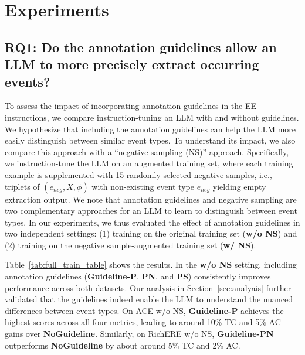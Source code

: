 \section{Experiments}




\subsection{RQ1: Do the annotation guidelines allow an LLM to more precisely extract occurring events?}
To assess the impact of incorporating annotation guidelines in the EE instructions, we compare instruction-tuning an LLM with and without guidelines. We hypothesize that including the annotation guidelines can help the LLM more easily distinguish between similar event types. To understand its impact, we also compare this approach with a ``negative sampling (NS)'' approach. Specifically, we instruction-tune the LLM on an augmented training set, where each training example is supplemented with 15 randomly selected negative samples, i.e., triplets of $(e_{neg}, X, \phi)$ with non-existing event type $e_{neg}$ yielding empty extraction output. We note that annotation guidelines and negative sampling are two complementary approaches for an LLM to learn to distinguish between event types. In our experiments, we thus evaluated the effect of annotation guidelines in two independent settings: (1) training on the original training set (\textbf{w/o NS}) and (2) training on the negative sample-augmented training set (\textbf{w/ NS}).


Table~\ref{tab:full_train_table} shows the results.
In the \textbf{w/o NS} setting, including annotation guidelines (\textbf{Guideline-P}, \textbf{PN}, and \textbf{PS}) consistently improves performance across both datasets. Our analysis in Section~\ref{sec:analyais} further validated that the guidelines indeed enable the LLM to understand the nuanced differences between event types. On {ACE w/o NS}, \textbf{Guideline-P} achieves the highest scores across all four metrics, leading to around 10\% TC and 5\% AC gains over \textbf{NoGuideline}.
Similarly, on {RichERE w/o NS}, \textbf{Guideline-PN} outperforms \textbf{NoGuideline} by about around 5\% TC and 2\% AC.  

